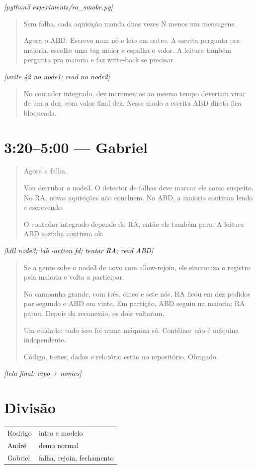 \documentclass[11pt,a4paper]{article}
\newcommand{\cue}[1]{\par\medskip\noindent\textit{[#1]}\par\medskip}
\begin{document}
\cue{python3 experiments/ra\_smoke.py}

\begin{quote}\large
Sem falha, cada aquisição manda duas vezes N menos um mensagens.

Agora o ABD. Escrevo num nó e leio em outro. A escrita pergunta pra maioria, escolhe uma tag maior e espalha o valor. A leitura também pergunta pra maioria e faz write-back se precisar.
\end{quote}

\cue{write 42 no node1; read no node2}

\begin{quote}\large
No contador integrado, dez incrementos ao mesmo tempo deveriam virar de um a dez, com valor final dez. Nesse modo a escrita ABD direta fica bloqueada.
\end{quote}

\section{3:20--5:00 --- Gabriel}

\begin{quote}\large
Agora a falha.

Vou derrubar o node3. O detector de falhas deve marcar ele como suspeito. No RA, novas aquisições não concluem. No ABD, a maioria continua lendo e escrevendo.

O contador integrado depende do RA, então ele também para. A leitura ABD sozinha continua ok.
\end{quote}

\cue{kill node3; lab -action fd; tentar RA; read ABD}

\begin{quote}\large
Se a gente sobe o node3 de novo com allow-rejoin, ele sincroniza o registro pela maioria e volta a participar.

Na campanha grande, com três, cinco e sete nós, RA ficou em dez pedidos por segundo e ABD em vinte. Em partição, ABD seguiu na maioria; RA parou. Depois da reconexão, os dois voltaram.

Um cuidado: tudo isso foi numa máquina só. Contêiner não é máquina independente.

Código, testes, dados e relatório estão no repositório. Obrigado.
\end{quote}

\cue{tela final: repo + nomes}

\section*{Divisão}
\begin{center}
\begin{tabular}{@{}ll@{}}
\toprule
Rodrigo & intro e modelo \\
André & demo normal \\
Gabriel & falha, rejoin, fechamento \\
\bottomrule
\end{tabular}
\end{center}
\end{document}
